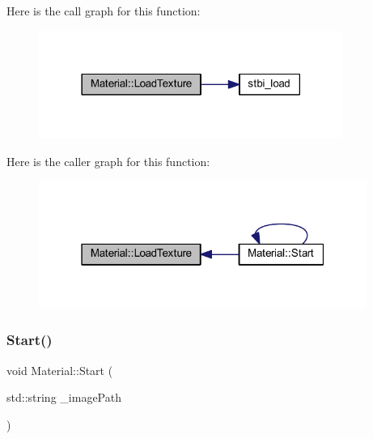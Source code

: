 Here is the call graph for this function\+:
\nopagebreak
\begin{figure}[H]
\begin{center}
\leavevmode
\includegraphics[width=282pt]{class_material_ae9aac906f4d3d12b8c97908647405111_cgraph}
\end{center}
\end{figure}
Here is the caller graph for this function\+:
\nopagebreak
\begin{figure}[H]
\begin{center}
\leavevmode
\includegraphics[width=304pt]{class_material_ae9aac906f4d3d12b8c97908647405111_icgraph}
\end{center}
\end{figure}
\mbox{\label{class_material_a8fcc1a8e83981ddd45c746c7ca98e46c}} 
\subsubsection{\texorpdfstring{Start()}{Start()}}
{\footnotesize\ttfamily void Material\+::\+Start (\begin{DoxyParamCaption}\item[{std\+::string}]{\+\_\+image\+Path }\end{DoxyParamCaption})}


